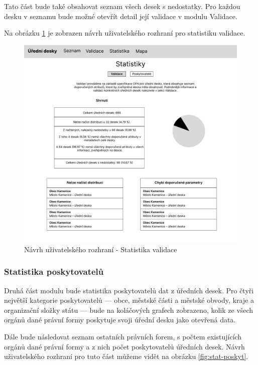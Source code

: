 Tato část bude také obsahovat seznam všech desek s nedostatky. Pro každou desku v seznamu bude možné otevřít detail její validace v modulu Validace.

Na obrázku \ref{fig:stat-validace} je zobrazen návrh uživatelského rozhraní pro statistiku validace.

\begin{figure} 
\includegraphics[width=\textwidth, frame]{cs/obrazky/wireframes/wireframe_statistika_validace.pdf}
\caption{Návrh uživatelského rozhraní - Statistika validace}
\label{fig:stat-validace}
\end{figure}

\subsubsection{Statistika poskytovatelů}

Druhá část modulu bude statistika poskytovatelů dat z úředních desek. Pro čtyři největší kategorie poskytovatelů --- obce, městské části a městské obvody, kraje a organizační složky státu --- bude na koláčových grafech zobrazeno, kolik ze všech orgánů dané právní formy poskytuje svoji úřední desku jako otevřená data.

Dále bude následovat seznam ostatních právních forem, s počtem existujících orgánů dané právní formy a z nich počet poskytovatelů úředních desek. Návrh uživatelského rozhraní pro tuto část můžeme vidět na obrázku \ref{fig:stat-poskyt}.

